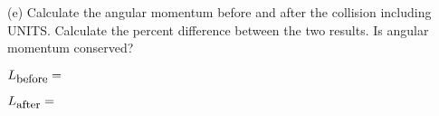\vspace{10mm}

(e) Calculate the angular momentum before and after the collision including UNITS. Calculate the percent difference between the two results. Is angular momentum conserved?
\vspace{10mm}

\( L_{\mbox{\small before}}= \)  
\vspace{10mm}

\( L_{\mbox{\small after}}= \)
\vspace{20mm}


